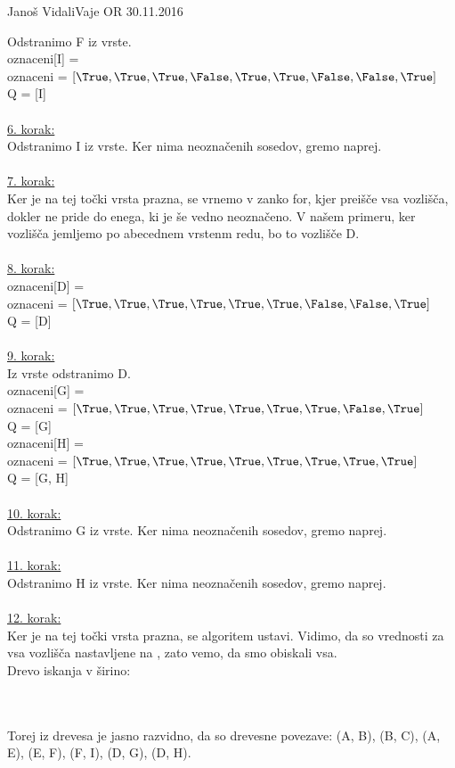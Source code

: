 \begin{naloga}{Janoš Vidali}{Vaje OR 30.11.2016}
\begin{odgovor}
Odstranimo F iz vrste.\\
oznaceni[I] = \True\\
oznaceni = $[\True, \True, \True, \False, \True, \True, \False, \False, \True]$\\
Q = [I]\\
\\
\underline{6. korak:}\\
Odstranimo I iz vrste. Ker nima neoznačenih sosedov, gremo naprej.\\
\\
\underline{7. korak:}\\
Ker je na tej točki vrsta prazna, se vrnemo v zanko for, kjer preišče vsa vozlišča, dokler ne pride do enega, ki je še vedno neoznačeno. V našem primeru, ker vozlišča jemljemo po abecednem vrstenm redu, bo to vozlišče D.\\
\\
\underline{8. korak:}\\
oznaceni[D] = \True\\
oznaceni = $[\True, \True, \True, \True, \True, \True, \False, \False, \True]$\\
Q = [D]\\
\\
\underline{9. korak:}\\
Iz vrste odstranimo D.\\
oznaceni[G] = \True\\
oznaceni = $[\True, \True, \True, \True, \True, \True, \True, \False, \True]$\\
Q = [G]\\
oznaceni[H] = \True\\
oznaceni = $[\True, \True, \True, \True, \True, \True, \True, \True, \True]$\\
Q = [G, H]\\
\\
\underline{10. korak:}\\
Odstranimo G iz vrste. Ker nima neoznačenih sosedov, gremo naprej.\\
\\
\underline{11. korak:}\\
Odstranimo H iz vrste. Ker nima neoznačenih sosedov, gremo naprej.\\
\\
\underline{12. korak:}\\
Ker je na tej točki vrsta prazna, se algoritem ustavi.
Vidimo, da so vrednosti za vsa vozlišča nastavljene na \True, zato vemo, da smo obiskali vsa. \\
%
Drevo iskanja v širino: 
%
\begin{slika}
\end{slika}
\\
\\
%
Torej iz drevesa  je jasno razvidno, da so drevesne povezave: (A, B), (B, C), (A, E), (E, F), (F, I), (D, G), (D, H).
%

\end{odgovor}
\end{naloga}
